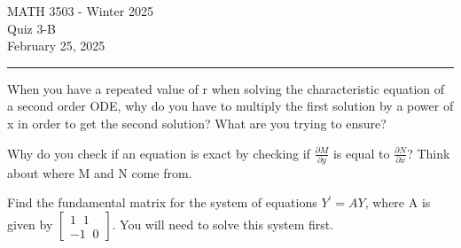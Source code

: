 \documentclass[12pt,letterpaper, onecolumn]{exam}
\begin{document}
\begingroup  
    \centering
    \LARGE MATH 3503 - Winter 2025\\
    \LARGE Quiz 3-B\\[0.5em]
    \large February 25, 2025\\[0.5em]
\endgroup
\rule{\textwidth}{0.4pt}
\pointsdroppedatright   %
\printanswers
\renewcommand{\solutiontitle}{\noindent\textbf{Ans:}\enspace}   %

\begin{questions}
    
    \question[3 Marks] When you have a repeated value of r when solving the characteristic equation of a second order ODE, why do you have to multiply the first solution by a power of x in order to get the second solution? What are you trying to ensure?\droppoints

    \bigskip
    \bigskip
    \bigskip
    \bigskip
    \bigskip
    \bigskip
    \bigskip
    \bigskip
    \bigskip
    \bigskip
    \bigskip
    \bigskip
    \bigskip
    \bigskip
    \bigskip
    \bigskip
    \bigskip
    \bigskip
    
    \question[3 Marks] Why do you check if an equation is exact by checking if $\frac{\partial M}{\partial y}$ is equal to $\frac{\partial N}{\partial x}$? Think about where M and N come from.\droppoints
    
    \pagebreak %
\thispagestyle{empty}   %
    
    \question[4 Marks] Find the fundamental matrix for the system of equations $Y^{'} = A Y$, where A is given by $\begin{bmatrix} 1 \; \; 1 \\ -1 \; \; 0 \end{bmatrix}$. You will need to solve this system first.\droppoints
    
\end{questions}
\end{document}
